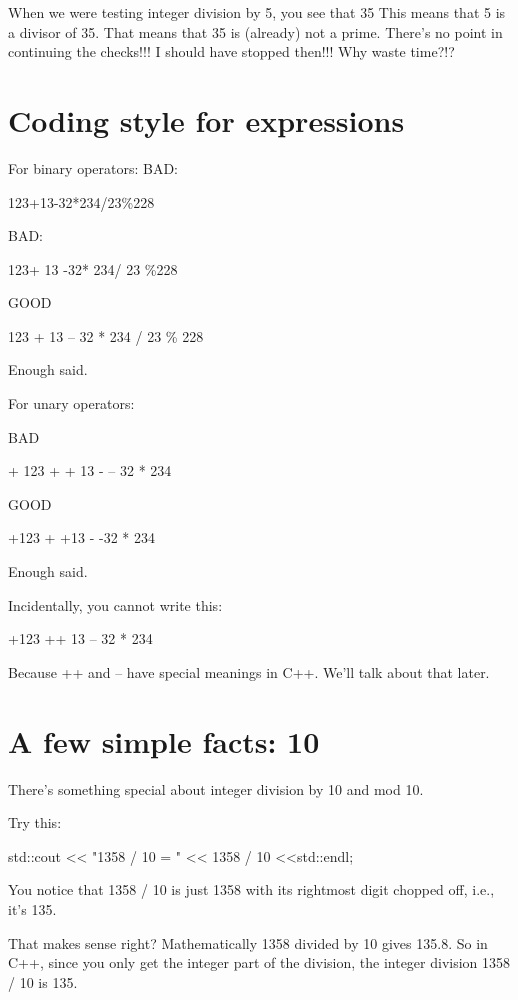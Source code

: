 When we were testing integer division by 5, you see that 35 %
This means that 5 is a divisor of 35. That means that 35 is (already) not
a prime. There's no point in continuing the checks!!! I should have
stopped then!!! Why waste time?!?


%
%

\newpage\section{Coding style for expressions}

For binary operators:
BAD:
\begin{console}
123+13-32*234/23\%228
\end{console}
BAD:
\begin{console}
123+ 13 -32*    234/    23    \%228
\end{console}
GOOD
\begin{console}
123 + 13 – 32 * 234 / 23 \% 228
\end{console}
Enough said.


For unary operators:

BAD
\begin{console}
+ 123 + + 13 - – 32 * 234
\end{console}
GOOD
\begin{console}
+123 + +13 - -32 * 234
\end{console}
Enough said.


Incidentally, you cannot write this:
\begin{console}
+123 ++ 13 -- 32 * 234
\end{console}

Because ++ and -- have special meanings in C++. We'll talk about that
later.

\newpage\section{A few simple facts: 10}

There's something special about integer division by 10 and mod 10.


Try this:
\begin{console}
std::cout << "1358 / 10 = " << 1358 / 10 <<std::endl;
\end{console}


You notice that 1358 / 10 is just 1358 with its rightmost digit chopped off,
i.e., it's 135.


That makes sense right? Mathematically 1358 divided by 10 gives 135.8.
So in C++, since you only get the integer part of the division, the integer
division 1358 / 10 is 135.


